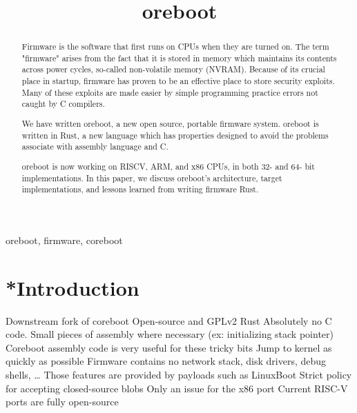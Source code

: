 \documentclass[conference]{IEEEtran}
\begin{document}
\title{oreboot}

\author{
\and
{}

}

\maketitle

\begin{abstract}
Firmware is the software that first runs on CPUs when they are turned on. 
The term "firmware" arises from the fact that it is stored in memory which maintains
its contents across power cycles, so-called non-volatile memory (NVRAM). 
Because of its crucial place in startup, firmware has proven to be an effective place to store security exploits\cite{cui2013firmware}. Many of these exploits are made easier
by simple programming practice errors not caught by C compilers.

We have written oreboot, a new open source, portable firmware system. 
oreboot is written in Rust\cite{balasubramanian2017system}, a new language which 
has properties designed to avoid the problems associate with assembly language and C.

oreboot is now working on RISCV, ARM, and x86 CPUs, in both 32- and 64- bit implementations. In this paper, we discuss oreboot's architecture, target implementations,
and lessons learned from writing firmware Rust. 


\end{abstract}

\begin{IEEEkeywords}
oreboot, firmware, coreboot
\end{IEEEkeywords}

\section{*Introduction}

Downstream fork of coreboot\cite{minnich2000linux}
Open-source and GPLv2
Rust
Absolutely no C code.
Small pieces of assembly where necessary (ex: initializing stack pointer)
Coreboot assembly code is very useful for these tricky bits
Jump to kernel as quickly as possible
Firmware contains no network stack, disk drivers, debug shells, …
Those features are provided by payloads such as LinuxBoot
Strict policy for accepting closed-source blobs
Only an issue for the x86 port
Current RISC-V ports are fully open-source
\end{document}
